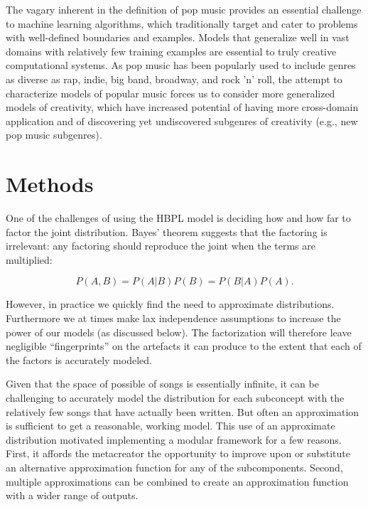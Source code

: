 \documentclass[letterpaper]{article}
\begin{document}

The vagary inherent in the definition of pop music provides an essential challenge to machine learning algorithms, which traditionally target and cater to problems with well-defined boundaries and examples. Models that generalize well in vast domains with relatively few training examples are essential to truly creative computational systems. As pop music has been popularly used to include genres as diverse as rap, indie, big band, broadway, and rock 'n' roll, the attempt to characterize models of popular music forces us to consider more generalized models of creativity, which have increased potential of having more cross-domain application and of discovering yet undiscovered subgenres of creativity (e.g., new pop music subgenres).

\section{Methods}

One of the challenges of using the HBPL model is deciding how and how far to factor the joint distribution. Bayes' theorem suggests that the factoring is irrelevant: any factoring should reproduce the joint when the terms are multiplied:

\[ P(A,B) = P(A|B)P(B) = P(B|A)P(A). \]

However, in practice we quickly find the need to approximate distributions. Furthermore we at times make lax independence assumptions to increase the power of our models (as discussed below). The factorization will therefore leave negligible ``fingerprints'' on the artefacts it can produce to the extent that each of the factors is accurately modeled.

Given that the space of possible of songs is essentially infinite, it can be challenging to accurately model the distribution for each subconcept with the relatively few songs that have actually been written. But often an approximation is sufficient to get a reasonable, working model. This use of an approximate distribution motivated implementing a modular framework for a few reasons. First, it affords the metacreator the opportunity to improve upon or substitute an alternative approximation function for any of the subcomponents. Second, multiple approximations can be combined to create an approximation function with a wider range of outputs.
\end{document}
